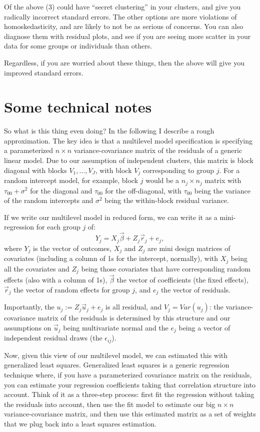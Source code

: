 \documentclass[
  letterpaper,
  DIV=11,
  numbers=noendperiod]{scrreprt}
\begin{document}
Of the above (3) could have ``secret clustering'' in your clusters, and
give you radically incorrect standard errors. The other options are more
violations of homoskedasticity, and are likely to not be as serious of
concerns. You can also diagnose them with residual plots, and see if you
are seeing more scatter in your data for some groups or individuals than
others.

Regardless, if you are worried about these things, then the above will
give you improved standard errors.

\section{Some technical notes}\label{some-technical-notes}

So what is this thing even doing? In the following I describe a rough
approximation. The key idea is that a multilevel model specification is
specifying a parameterized \(n \times n\) variance-covariance matrix of
the residuals of a generic linear model. Due to our assumption of
independent clusters, this matrix is block diagonal with blocks
\(V_1, \ldots, V_J\), with block \(V_j\) corresponding to group \(j\).
For a random intercept model, for example, block \(j\) would be a
\(n_j \times n_j\) matrix with \(\tau_{00} + \sigma^2\) for the diagonal
and \(\tau_{00}\) for the off-diagonal, with \(\tau_{00}\) being the
variance of the random intercepts and \(\sigma^2\) being the
within-block residual variance.

If we write our multilevel model in reduced form, we can write it as a
mini-regression for each group \(j\) of: \[
Y_j = X_j \vec{\beta} + Z_j \vec{r}_j + e_j ,
\] where \(Y_j\) is the vector of outcomes, \(X_j\) and \(Z_j\) are mini
design matrices of covariates (including a column of 1s for the
intercept, normally), with \(X_j\) being all the covariates and \(Z_j\)
being those covariates that have corresponding random effects (also with
a column of 1s), \(\vec{\beta}\) the vector of coefficients (the fixed
effects), \(\vec{r}_j\) the vector of random effects for group \(j\),
and \(e_j\) the vector of residuals.

Importantly, the \(u_j := Z_j \vec{u}_j + e_j\) is all residual, and
\(V_j = Var( u_j )\): the variance-covariance matrix of the residuals is
determined by this structure and our assumptions on \(\vec{u}_j\) being
multivariate normal and the \(e_j\) being a vector of independent
residual draws (the \(\epsilon_{ij}\)).

Now, given this view of our multilevel model, we can estimated this with
generalized least squares. Generalized least squares is a generic
regression technique where, if you have a parameterized covariance
matrix on the residuals, you can estimate your regression coefficients
taking that correlation structure into account. Think of it as a
three-step process: first fit the regression without taking the
residuals into account, then use the fit model to estimate our big
\(n \times n\) variance-covariance matrix, and then use this estimated
matrix as a set of weights that we plug back into a least squares
estimation.
\end{document}
